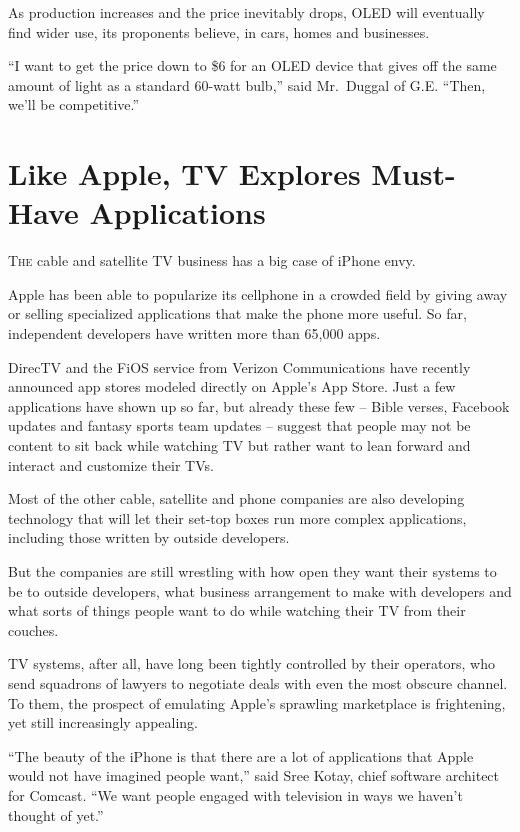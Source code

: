 ﻿\documentclass[12pt]{article}
\begin{document}
As production increases and the price inevitably drops, OLED will eventually find wider use, its
proponents believe, in cars, homes and businesses.

``I want to get the price down to \$6 for an OLED device that gives off the same amount of light as
a standard 60-watt bulb,'' said Mr.~Duggal of G.E. ``Then, we'll be competitive.''

\section{Like Apple, TV Explores Must-Have Applications}

\lettrine{T}{he} cable and satellite TV business has a big case of iPhone envy.

Apple has been able to popularize its cellphone in a crowded field by giving away or selling
specialized applications that make the phone more useful. So far, independent developers have
written more than 65,000 apps.

DirecTV and the FiOS service from Verizon Communications have recently announced app stores modeled
directly on Apple's App Store. Just a few applications have shown up so far, but already these few
-- Bible verses, Facebook updates and fantasy sports team updates -- suggest that people may not be
content to sit back while watching TV but rather want to lean forward and interact and customize
their TVs.

Most of the other cable, satellite and phone companies are also developing technology that will let
their set-top boxes run more complex applications, including those written by outside developers.

But the companies are still wrestling with how open they want their systems to be to outside
developers, what business arrangement to make with developers and what sorts of things people want
to do while watching their TV from their couches.

TV systems, after all, have long been tightly controlled by their operators, who send squadrons of
lawyers to negotiate deals with even the most obscure channel. To them, the prospect of emulating
Apple's sprawling marketplace is frightening, yet still increasingly appealing.

``The beauty of the iPhone is that there are a lot of applications that Apple would not have
imagined people want,'' said Sree Kotay, chief software architect for Comcast. ``We want people
engaged with television in ways we haven't thought of yet.''
\end{document}
